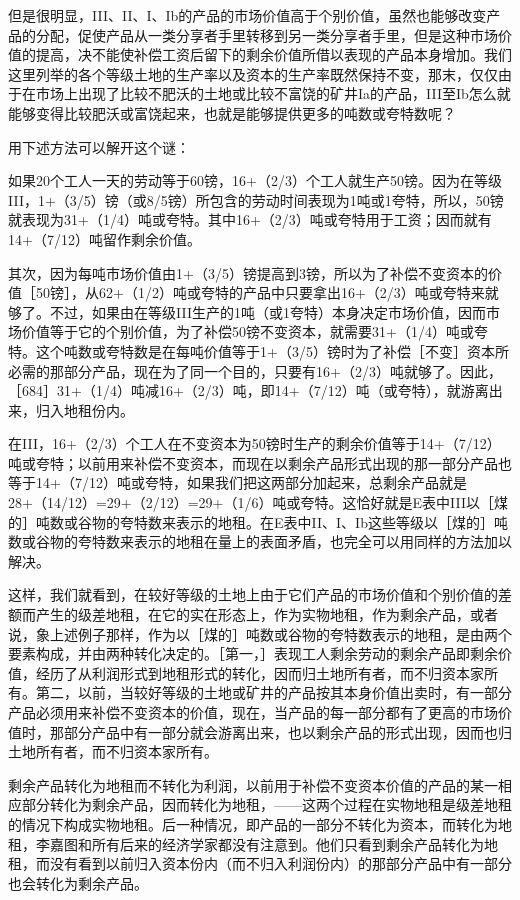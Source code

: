 但是很明显，III、II、I、Ib的产品的市场价值高于个别价值，虽然也能够改变产品的分配，促使产品从一类分享者手里转移到另一类分享者手里，但是这种市场价值的提高，决不能使补偿工资后留下的剩余价值所借以表现的产品本身增加。我们这里列举的各个等级土地的生产率以及资本的生产率既然保持不变，那末，仅仅由于在市场上出现了比较不肥沃的土地或比较不富饶的矿井Ia的产品，III至Ib怎么就能够变得比较肥沃或富饶起来，也就是能够提供更多的吨数或夸特数呢？

用下述方法可以解开这个谜：

如果20个工人一天的劳动等于60镑，16+（2/3）个工人就生产50镑。因为在等级III，1+（3/5）镑（或8/5镑）所包含的劳动时间表现为1吨或1夸特，所以，50镑就表现为31+（1/4）吨或夸特。其中16+（2/3）吨或夸特用于工资；因而就有14+（7/12）吨留作剩余价值。

其次，因为每吨市场价值由1+（3/5）镑提高到3镑，所以为了补偿不变资本的价值［50镑］，从62+（1/2）吨或夸特的产品中只要拿出16+（2/3）吨或夸特来就够了。不过，如果由在等级III生产的1吨（或1夸特）本身决定市场价值，因而市场价值等于它的个别价值，为了补偿50镑不变资本，就需要31+（1/4）吨或夸特。这个吨数或夸特数是在每吨价值等于1+（3/5）镑时为了补偿［不变］资本所必需的那部分产品，现在为了同一个目的，只要有16+（2/3）吨就够了。因此，［684］31+（1/4）吨减16+（2/3）吨，即14+（7/12）吨（或夸特），就游离出来，归入地租份内。

在III，16+（2/3）个工人在不变资本为50镑时生产的剩余价值等于14+（7/12）吨或夸特；以前用来补偿不变资本，而现在以剩余产品形式出现的那一部分产品也等于14+（7/12）吨或夸特，如果我们把这两部分加起来，总剩余产品就是28+（14/12）=29+（2/12）=29+（1/6）吨或夸特。这恰好就是E表中III以［煤的］吨数或谷物的夸特数来表示的地租。在E表中II、I、Ib这些等级以［煤的］吨数或谷物的夸特数来表示的地租在量上的表面矛盾，也完全可以用同样的方法加以解决。

这样，我们就看到，在较好等级的土地上由于它们产品的市场价值和个别价值的差额而产生的级差地租，在它的实在形态上，作为实物地租，作为剩余产品，或者说，象上述例子那样，作为以［煤的］吨数或谷物的夸特数表示的地租，是由两个要素构成，并由两种转化决定的。［第一，］表现工人剩余劳动的剩余产品即剩余价值，经历了从利润形式到地租形式的转化，因而归土地所有者，而不归资本家所有。第二，以前，当较好等级的土地或矿井的产品按其本身价值出卖时，有一部分产品必须用来补偿不变资本的价值，现在，当产品的每一部分都有了更高的市场价值时，那部分产品中有一部分就会游离出来，也以剩余产品的形式出现，因而也归土地所有者，而不归资本家所有。

剩余产品转化为地租而不转化为利润，以前用于补偿不变资本价值的产品的某一相应部分转化为剩余产品，因而转化为地租，——这两个过程在实物地租是级差地租的情况下构成实物地租。后一种情况，即产品的一部分不转化为资本，而转化为地租，李嘉图和所有后来的经济学家都没有注意到。他们只看到剩余产品转化为地租，而没有看到以前归入资本份内（而不归入利润份内）的那部分产品中有一部分也会转化为剩余产品。

